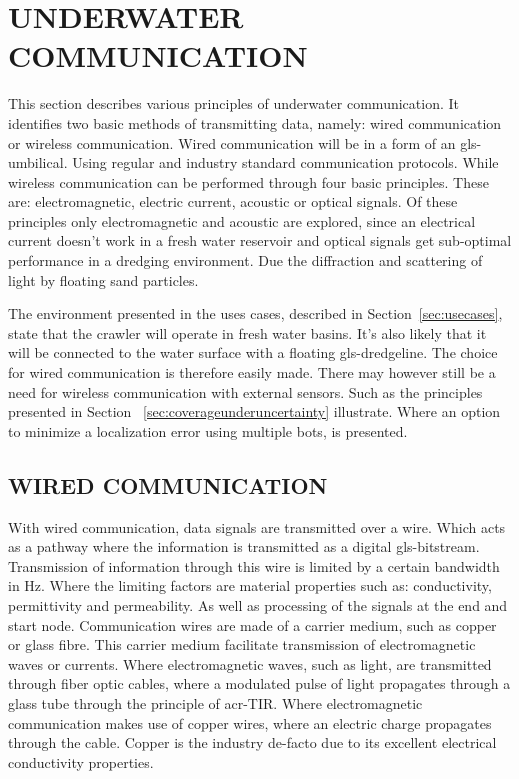 
\section{UNDERWATER COMMUNICATION}\label{sec:underwater_communication}
This section describes various principles of underwater communication. It identifies two basic methods of transmitting data, namely: wired communication or wireless communication. Wired communication will be in a form of an \gls{gls-umbilical}. Using regular and industry standard communication protocols. While wireless communication can be performed through four basic principles. These are: electromagnetic, electric current, acoustic or optical signals. Of these principles only electromagnetic and acoustic are explored, since an electrical current doesn't work in a fresh water reservoir and optical signals get sub-optimal performance in a dredging environment. Due the diffraction and scattering of light by floating sand particles.

The environment presented in the uses cases, described in Section~\ref{sec:usecases}, state that the crawler will
operate in fresh water basins. It's also likely that it will be connected to the water surface with a floating
\gls{gls-dredgeline}. The choice for wired communication is therefore easily made. There may however still be a need for
wireless communication with external sensors. Such as the principles presented in Section
~\ref{sec:coverageunderuncertainty} illustrate. Where an option to minimize a localization error using multiple bots, is
presented.

\subsection{WIRED COMMUNICATION}\label{sec:wired communication}
With wired communication, data signals are transmitted over a wire. Which acts as a pathway where the information is transmitted as a digital \gls{gls-bitstream}. Transmission of information through this wire is limited by a certain bandwidth in \( \si{\hertz} \).
Where the limiting factors are material properties such as: conductivity, permittivity and permeability. As well as processing of the signals at the end and start node. Communication wires are made of a carrier medium, such as copper or glass fibre.
This carrier medium facilitate transmission of electromagnetic waves or currents. Where electromagnetic waves, such as light, are transmitted through fiber optic cables, where a modulated pulse of light propagates through a glass tube through the principle of \gls{acr-TIR}.
Where  electromagnetic communication makes use of copper wires, where an electric charge propagates through the cable. Copper is the industry de-facto due to its excellent electrical conductivity properties.

